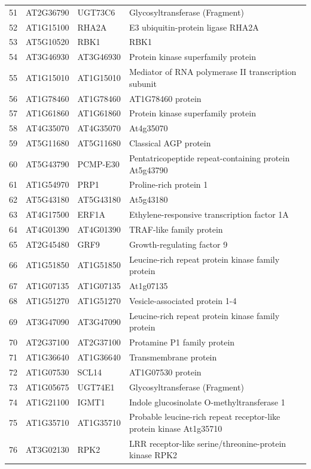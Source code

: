 \documentclass[11pt]{article}
\begin{document}
\begin{center}
\begin{tabular}{rlll}
51 & AT2G36790 & UGT73C6 & Glycosyltransferase (Fragment)\\
52 & AT1G15100 & RHA2A & E3 ubiquitin-protein ligase RHA2A\\
53 & AT5G10520 & RBK1 & RBK1\\
54 & AT3G46930 & AT3G46930 & Protein kinase superfamily protein\\
55 & AT1G15010 & AT1G15010 & Mediator of RNA polymerase II transcription subunit\\
56 & AT1G78460 & AT1G78460 & AT1G78460 protein\\
57 & AT1G61860 & AT1G61860 & Protein kinase superfamily protein\\
58 & AT4G35070 & AT4G35070 & At4g35070\\
59 & AT5G11680 & AT5G11680 & Classical AGP protein\\
60 & AT5G43790 & PCMP-E30 & Pentatricopeptide repeat-containing protein At5g43790\\
61 & AT1G54970 & PRP1 & Proline-rich protein 1\\
62 & AT5G43180 & AT5G43180 & At5g43180\\
63 & AT4G17500 & ERF1A & Ethylene-responsive transcription factor 1A\\
64 & AT4G01390 & AT4G01390 & TRAF-like family protein\\
65 & AT2G45480 & GRF9 & Growth-regulating factor 9\\
66 & AT1G51850 & AT1G51850 & Leucine-rich repeat protein kinase family protein\\
67 & AT1G07135 & AT1G07135 & At1g07135\\
68 & AT1G51270 & AT1G51270 & Vesicle-associated protein 1-4\\
69 & AT3G47090 & AT3G47090 & Leucine-rich repeat protein kinase family protein\\
70 & AT2G37100 & AT2G37100 & Protamine P1 family protein\\
71 & AT1G36640 & AT1G36640 & Transmembrane protein\\
72 & AT1G07530 & SCL14 & AT1G07530 protein\\
73 & AT1G05675 & UGT74E1 & Glycosyltransferase (Fragment)\\
74 & AT1G21100 & IGMT1 & Indole glucosinolate O-methyltransferase 1\\
75 & AT1G35710 & AT1G35710 & Probable leucine-rich repeat receptor-like protein kinase At1g35710\\
76 & AT3G02130 & RPK2 & LRR receptor-like serine/threonine-protein kinase RPK2\\

\end{tabular}
\end{center}
\end{document}
